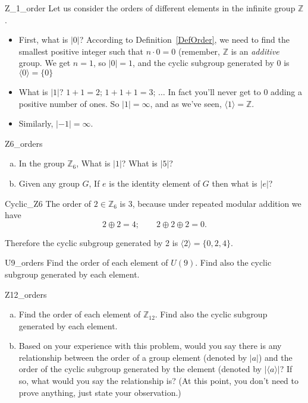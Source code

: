 \begin{example}{Z_1_order}
Let us consider the orders of different elements in the infinite group $\mathbb Z$.
\begin{itemize}
\item
First, what is $| 0 |$?  According to Definition~\ref{DefOrder}, we need to find the smallest positive integer such that $n \cdot 0 = 0$  (remember, $\mathbb Z$ is an \emph{additive} group. We get $n=1$, so $| 0 | =1$, and the cyclic subgroup generated by $0$ is $\langle 0 \rangle = \{ 0 \}$
\item
What is $| 1 |$?  $1 + 1 = 2$; $1 + 1 + 1 = 3$; $\ldots$  In fact you'll never get to $0$ adding a positive number of ones.  So $| 1 | = \infty$, and as we've seen, $\langle 1 \rangle = \mathbb Z$.
\item
Similarly, $| -1 | = \infty$.
\end{itemize}
\end{example}

\begin{exercise}{Z6_orders}
\begin{enumerate}[(a)]
\item
In the group ${\mathbb Z}_6$, What is $| 1 |$? What is $| 5 |$?
\item
 Given any group $G$, If $e$ is the identity element of $G$ then what is $|e|$?
\end{enumerate}
 \end{exercise}

\begin{example}{Cyclic_Z6}
The order of $2 \in {\mathbb Z}_6$ is 3, because under repeated modular addition we have
\[
2 \oplus 2 = 4;\qquad  2 \oplus  2 \oplus  2 = 0.\]

\noindent
Therefore the cyclic subgroup generated by 2 is $\langle 2 \rangle  = \{ 0, 2, 4\}$.  
\end{example}

\begin{exercise}{U9_orders}
Find the order of each element of $U(9)$. Find also the cyclic subgroup generated by each element.
\end{exercise}

\begin{exercise}{Z12_orders}
\begin{enumerate}[(a)]
\item
Find the order of each element of $\mathbb{Z}_{12}$. Find also the cyclic subgroup generated by each element.
\item
Based on your experience with this problem, would you say there is any relationship between the order of a group element (denoted by $|a|$) and the order of the cyclic subgroup generated by the element (denoted by $|\langle a \rangle |$? If so, what would you say the relationship is?  (At this point, you don't need to prove anything, just state your observation.)
\end{enumerate}
\end{exercise}


